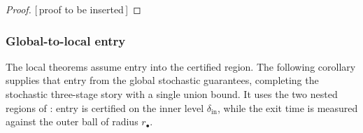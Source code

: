 \documentclass[11pt]{article}
\theoremstyle{plain}
\theoremstyle{definition}
\theoremstyle{remark}
\newcommand{\PROOFHOLE}{{\color{red}\textsf{[\,proof to be inserted\,]}}}
\begin{document}
\begin{proof}
\PROOFHOLE
\end{proof}

\subsubsection{Global-to-local entry}
\label{subsec:global-to-local}

The local theorems assume entry into the certified region. The following corollary supplies that
entry from the global stochastic guarantees, completing the stochastic three-stage story with a
single union bound. It uses the two nested regions of : entry is certified
on the inner level $\delta_{\mathrm{in}}$, while the exit time is measured against the outer ball of
radius $r_\bullet$.
\end{document}
